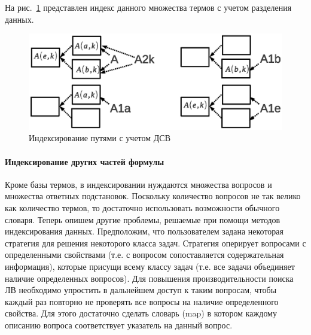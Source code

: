 На рис.~\ref{fig:sharedindex2} представлен индекс данного множества термов с учетом разделения данных.

\begin{figure}[h]
	\centering
	\includegraphics[width=0.7\linewidth]{pics/SharedIndex2.eps}
	\caption{Индексирование путями с учетом ДСВ}
	\label{fig:sharedindex2}
\end{figure}



\paragraph{Индексирование других частей формулы}
Кроме базы термов, в индексировании нуждаются множества вопросов и множества ответных подстановок. Поскольку количество вопросов не так велико как количество термов, то достаточно использовать возможности обычного словаря.
Теперь опишем другие проблемы, решаемые при помощи методов индексирования данных. Предположим, что пользователем задана некоторая стратегия для решения некоторого класса задач. Стратегия оперирует вопросами с определенными свойствами (т.е. с вопросом сопоставляется содержательная информация), которые присущи всему классу задач (т.е. все задачи объединяет наличие определенных вопросов). Для повышения производительности поиска ЛВ необходимо упростить в дальнейшем доступ к таким вопросам, чтобы каждый раз повторно не проверять все вопросы на наличие определенного свойства. Для этого достаточно сделать словарь (map) в котором каждому описанию вопроса соответствует указатель на данный вопрос. %


